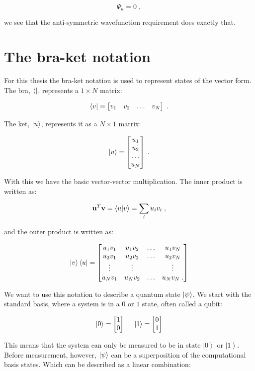 $$\Psi_a = 0 \; ,$$

we see that the anti-symmetric wavefunction requirement does exactly that.


\section{The bra-ket notation}

For this thesis the bra-ket notation is used to represent states of the vector form. The bra, $\bra{}$, represents a $1 \times N$ matrix:

$$\bra{v} = \begin{bmatrix} v_1 & v_2 & \dots & v_N \end{bmatrix} \; .$$

The ket, $\ket{u}$, represents it as a $N \times 1$ matrix:

$$\ket{u} = \begin{bmatrix} u_1 \\ u_2 \\ \dots \\ u_N \end{bmatrix} \; .$$

With this we have the basic vector-vector multiplication. The inner product is written as:

$$\mathbf{u}^T\mathbf{v} = \braket{u}{v} = \sum_i u_iv_i \; ,$$

and the outer product is written as:

$$\ket{v}\bra{u} = \begin{bmatrix}
  u_{1}v_{1}&u_{1}v_{2}&\dots&u_{1}v_{N}\\
  u_{2}v_{1}&u_{2}v_{2}&\dots&u_{2}v_{N}\\
 \vdots & \vdots & & \vdots \\
 u_{N}v_{1}&u_{N}v_{2}&\dots&u_{N}v_{N} \; .
\end{bmatrix}$$

We want to use this notation to describe a quantum state $\ket{\psi}$. We start with the standard basis, where a system is in a $0$ or $1$ state, often called a qubit:

$$\ket{0} = \begin{bmatrix}
  1 \\ 0
\end{bmatrix} \;\;\;\;\; \ket{1} = \begin{bmatrix}
  0 \\ 1
\end{bmatrix}$$

This means that the system can only be measured to be in state $\left | 0 \right >$ or $\left | 1 \right >$. Before measurement, however, $\ket{\psi}$ can be a superposition of the computational basis states. Which can be described as a linear combination:

